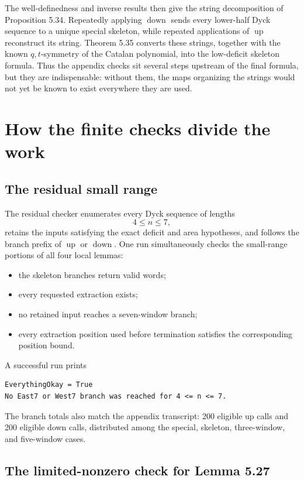 \documentclass{article}
\newcommand{\upmap}{\operatorname{up}}
\newcommand{\downmap}{\operatorname{down}}
\begin{document}
The well-definedness and inverse results then give the string decomposition of
Proposition 5.34.  Repeatedly applying $\downmap$ sends every lower-half Dyck
sequence to a unique special skeleton, while repeated applications of
$\upmap$ reconstruct its string.  Theorem 5.35 converts these strings, together
with the known $q,t$-symmetry of the Catalan polynomial, into the low-deficit
skeleton formula.  Thus the appendix checks sit several steps upstream of the
final formula, but they are indispensable: without them, the maps organizing
the strings would not yet be known to exist everywhere they are used.

\section{How the finite checks divide the work}

\subsection{The residual small range}

The residual checker enumerates every Dyck sequence of lengths
\[
  4\leq n\leq7,
\]
retains the inputs satisfying the exact deficit and area hypotheses, and
follows the branch prefix of $\upmap$ or $\downmap$.  One run simultaneously
checks the small-range portions of all four local lemmas:

\begin{itemize}
\item the skeleton branches return valid words;
\item every requested extraction exists;
\item no retained input reaches a seven-window branch;
\item every extraction position used before termination satisfies the
      corresponding position bound.
\end{itemize}

A successful run prints
\begin{verbatim}
EverythingOkay = True
No East7 or West7 branch was reached for 4 <= n <= 7.
\end{verbatim}
The branch totals also match the appendix transcript: 200 eligible up calls
and 200 eligible down calls, distributed among the special, skeleton,
three-window, and five-window cases.

\subsection{The limited-nonzero check for Lemma 5.27}
\end{document}
